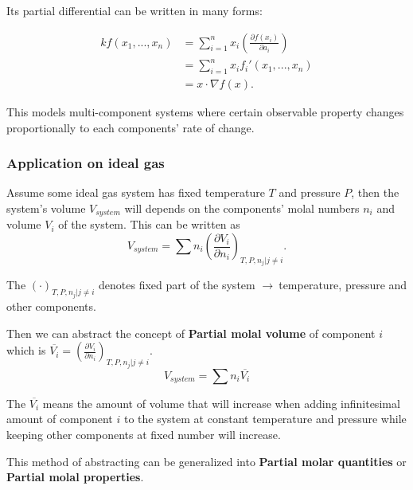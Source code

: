 \documentclass[11pt,a4paper,fleqn]{article}
\numberwithin{equation}{section}
\newcommand{\go}{$ \rightarrow\ $}
\newcommand{\Concept}{\textbf}
\newcommand{\Del}{\ensuremath{\nabla}}
\begin{document}
Its partial differential can be written in many forms:

\begin{align}
  k f(x_1,...,x_n)
  & = \sum_{i=1}^{n} x_i \left(\frac{\partial f(x_i)}{\partial a_i} \right) \\
  & = \sum_{i=1}^{n} x_i f_i'(x_1,...,x_n) \\
  & = x\cdot\Del f(x).
\end{align}

This models multi-component systems where certain observable property changes proportionally to each components' rate of change.

\subsubsection{Application on ideal gas}
Assume some ideal gas system has fixed temperature $T$ and pressure $P$, then the system's volume $V_{system}$ will depends on the components' molal numbers $n_i$ and volume $V_i$ of the system. This can be written as
\begin{equation}
  V_{system} = \sum n_i \left( \frac{\partial V_i}{\partial n_i} \right)_{T,P,{n_j|j\neq i}}.
\end{equation}

The $\left( \cdotp \right)_{T,P,{n_j|j\neq i}}$ denotes fixed part of the system \go temperature, pressure and other components.

Then we can abstract the concept of \Concept{Partial molal volume} of component $i$ which is $\overline{V_i} = \left( \frac{\partial V_i}{\partial n_i} \right)_{T,P,{n_j|j\neq i}}$.
\begin{equation}
  V_{system} =\sum n_i \overline{V_i}
\end{equation}

The $\overline{V_i}$ means the amount of volume that will increase when adding infinitesimal amount of component $i$ to the system at constant temperature and pressure while keeping other components at fixed number will increase.

This method of abstracting can be generalized into \Concept{Partial molar quantities} or \Concept{Partial molal properties}.
\end{document}
